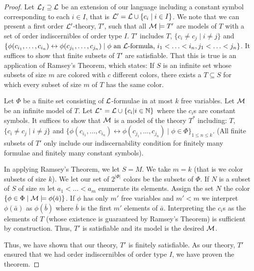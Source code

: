 \begin{proof}
Let \(\mathcal{L}_I \supseteq \mathcal{L}\) be an extension of our language including a constant symbol corresponding to each \(i \in I\), that is \(\mathcal{L}' = \mathcal{L} \cup \{c_i \mid i \in I\}\).
We note that we can present a first order \(\mathcal{L}'\)-theory, \(T'\), such that all \(\mathcal{M} \models T'\) are models of \(T\) with a set of order indiscernibles of order type \(I\).
\(T'\) includes \(T\), \(\{c_i \neq c_j \mid i \neq j\}\) and \(\{\phi(c_{i_1}, \ldots, c_{i_n}) \leftrightarrow \phi(c_{j_1}, \ldots, c_{j_n}) \mid \phi \text{ an } \mathcal{L} \text{-formula, } i_1 < \ldots < i_n, j_1 < \ldots < j_n\}\). 
It suffices to show that finite subsets of \(T'\) are satisfiable. 
That this is true is an application of Ramsey's Theorem, which states: 
If \(S\) is an infinite set whose subsets of size \(m\) are colored with \(c\) different colors, there exists a \(T \subseteq S\) for which every subset of size \(m\) of \(T\) has the same color. 

Let \(\Phi\) be a finite set consisting of \(\mathcal{L}\)-formulae in at most \(k\) free variables. 
Let \(\mathcal{M}\) be an infinite model of \(T\). 
Let \(\mathcal{L}^* = \mathcal{L} \cup \{c_i | i \in \mathbb{N}\}\) where the \(c_i\)s are constant symbols.
It suffices to show that \(\mathcal{M}\) is a model of the theory \(T^*\) including: \(T\), \(\{c_i \neq c_j \mid i \neq j\}\) and \(\{\phi(c_{i_1}, \ldots, c_{i_n}) \leftrightarrow \phi(c_{j_1}, \ldots, c_{j_n}) \mid \phi \in \Phi\}_{1 \leq n \leq k}\). 
(All finite subsets of \(T'\) only include our indiscernability condition for finitely many formulae and finitely many constant symbols).

In applying Ramsey's Theorem, we let \(S = M\). 
We take \(m = k\) (that is we color subsets of size \(k\)).
We let our set of \(2^{|\Phi|}\) colors be the subsets of \(\Phi\). 
If \(N\) is a subset of \(S\) of size \(m\) let \(a_1 < \ldots < a_m\) enumerate its elements. 
Assign the set \(N\) the color \(\{\phi \in \Phi \mid \mathcal{M} \models \phi(\bar{a})\}\). 
If \(\phi\) has only \(m'\) free variables and \(m' < m\) we interpret \(\phi(\bar{a})\) as \(\phi(\bar{b})\) where \(\bar{b}\) is the first \(m'\) elements of \(\bar{a}\).
Interpreting the \(c_i\)s as the elements of \(T\) (whose existence is guaranteed by Ramsey's Theorem) is sufficient by construction. Thus, \(T'\) is satisfiable and its model is the desired \(\mathcal{M}\).

Thus, we have shown that our theory, \(T'\) is finitely satisfiable.
As our theory, \(T'\) ensured that we had order indiscernibles of order type \(I\), we have proven the theorem.
\end{proof}

